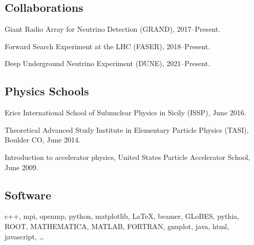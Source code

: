 \documentclass{article}
\renewenvironment{itemize}{
\begin{list}{}{
\setlength{\leftmargin}{.5em}}}{
\end{list}}
\begin{document}
\subsection*{Collaborations}
\begin{itemize}
\item Giant Radio Array for Neutrino Detection (GRAND), 2017--Present.
\item Forward Search Experiment at the LHC (FASER), 2018--Present.
\item Deep Underground Neutrino Experiment (DUNE), 2021--Present.
\end{itemize}

\subsection*{Physics Schools}
\begin{itemize}
\item Erice International School of Subnuclear Physics in Sicily (ISSP), June 2016.
\item Theoretical Advanced Study Institute in Elementary Particle Physics (TASI), Boulder CO, June 2014.
\item Introduction to accelerator physics, United States Particle Accelerator School, June 2009.
\end{itemize}

\subsection*{Software}
\begin{itemize}
\item 
c++, mpi, openmp, python, matplotlib, \LaTeX, beamer, GLoBES, pythia, ROOT, MATHEMATICA, MATLAB, FORTRAN, gnuplot, java, html, javascript, \dots
\end{itemize}
\end{document}

